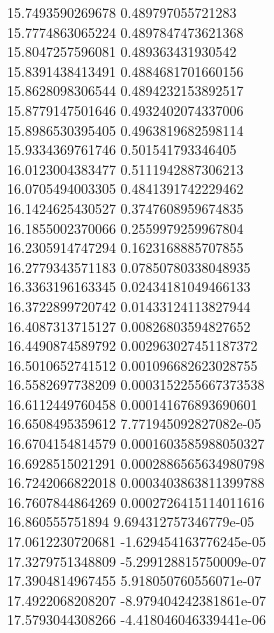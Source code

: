 {15.7493590269678 0.489797055721283
 \\
15.7774863065224 0.4897847473621368
 \\
15.8047257596081 0.489363431930542
 \\
15.8391438413491 0.4884681701660156
 \\
15.8628098306544 0.4894232153892517
 \\
15.8779147501646 0.4932402074337006
 \\
15.8986530395405 0.4963819682598114
 \\
15.9334369761746 0.501541793346405
 \\
16.0123004383477 0.5111942887306213
 \\
16.0705494003305 0.4841391742229462
 \\
16.1424625430527 0.3747608959674835
 \\
16.1855002370066 0.2559979259967804
 \\
16.2305914747294 0.1623168885707855
 \\
16.2779343571183 0.07850780338048935
 \\
16.3363196163345 0.02434181049466133
 \\
16.3722899720742 0.01433124113827944
 \\
16.4087313715127 0.00826803594827652
 \\
16.4490874589792 0.002963027451187372
 \\
16.5010652741512 0.001096682623028755
 \\
16.5582697738209 0.0003152255667373538
 \\
16.6112449760458 0.000141676893690601
 \\
16.6508495359612 7.771945092827082e-05
 \\
16.6704154814579 0.0001603585988050327
 \\
16.6928515021291 0.0002886565634980798
 \\
16.7242066822018 0.0003403863811399788
 \\
16.7607844864269 0.0002726415114011616
 \\
16.860555751894 9.694312757346779e-05
 \\
17.0612230720681 -1.629454163776245e-05
 \\
17.3279751348809 -5.299128815750009e-07
 \\
17.3904814967455 5.918050760556071e-07
 \\
17.4922068208207 -8.979404242381861e-07
 \\
17.5793044308266 -4.418046046339441e-06
 \\
}
